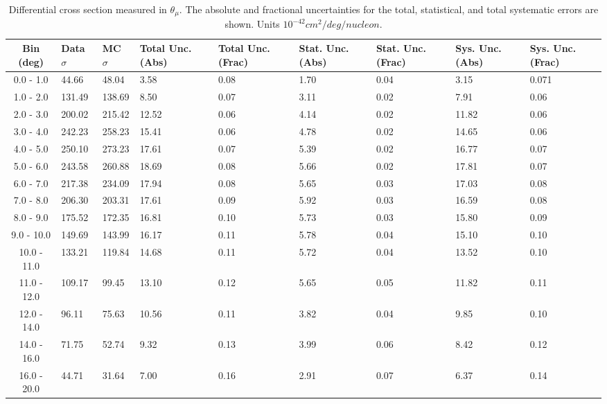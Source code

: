 \begin{table}[!htb]
    \centering
    \tiny
    \begin{tabular}{|c|p{0.5in}|p{0.5in}|p{0.5in}|p{0.5in}|p{0.5in}|p{0.5in}|p{0.5in}|p{0.5in}|}
        \hline
        Bin (deg)& Data $\sigma$ & MC $\sigma$ & Total Unc. (Abs) & Total Unc. (Frac)  & Stat. Unc. (Abs) & Stat. Unc. (Frac) & Sys. Unc. (Abs) & Sys. Unc. (Frac)\\ \hline
0.0 - 1.0 & 44.66 & 48.04 & 3.58 & 0.08 & 1.70 & 0.04 & 3.15 & 0.071\\ \hline
1.0 - 2.0 & 131.49 & 138.69 & 8.50 & 0.07 & 3.11 & 0.02 & 7.91 & 0.06\\ \hline
2.0 - 3.0 & 200.02 & 215.42 & 12.52 & 0.06 & 4.14 & 0.02 & 11.82 & 0.06\\ \hline
3.0 - 4.0 & 242.23 & 258.23 & 15.41 & 0.06 & 4.78 & 0.02 & 14.65 & 0.06\\ \hline
4.0 - 5.0 & 250.10 & 273.23 & 17.61 & 0.07 & 5.39 & 0.02 & 16.77 & 0.07\\ \hline
5.0 - 6.0 & 243.58 & 260.88 & 18.69 & 0.08 & 5.66 & 0.02 & 17.81 & 0.07\\ \hline
6.0 - 7.0 & 217.38 & 234.09 & 17.94 & 0.08 & 5.65 & 0.03 & 17.03 & 0.08\\ \hline
7.0 - 8.0 & 206.30 & 203.31 & 17.61 & 0.09 & 5.92 & 0.03 & 16.59 & 0.08\\ \hline
8.0 - 9.0 & 175.52 & 172.35 & 16.81 & 0.10 & 5.73 & 0.03 & 15.80 & 0.09\\ \hline
9.0 - 10.0 & 149.69 & 143.99 & 16.17 & 0.11 & 5.78 & 0.04 & 15.10 & 0.10\\ \hline
10.0 - 11.0 & 133.21 & 119.84 & 14.68 & 0.11 & 5.72 & 0.04 & 13.52 & 0.10\\ \hline
11.0 - 12.0 & 109.17 & 99.45 & 13.10 & 0.12 & 5.65 & 0.05 & 11.82 & 0.11\\ \hline
12.0 - 14.0 & 96.11 & 75.63 & 10.56 & 0.11 & 3.82 & 0.04 & 9.85 & 0.10\\ \hline
14.0 - 16.0 & 71.75 & 52.74 & 9.32 & 0.13 & 3.99 & 0.06 & 8.42 & 0.12\\ \hline
16.0 - 20.0 & 44.71 & 31.64 & 7.00 & 0.16 & 2.91 & 0.07 & 6.37 & 0.14\\ \hline


    \end{tabular}
    \caption{Differential cross section measured in $\theta_\mu$. The absolute and fractional uncertainties for the total, statistical, and total systematic errors are shown. Units $10^{-42}cm^2/deg/nucleon$.}
    \label{tab:ApdxA:XSecTable1Dthetamu}
\end{table}

